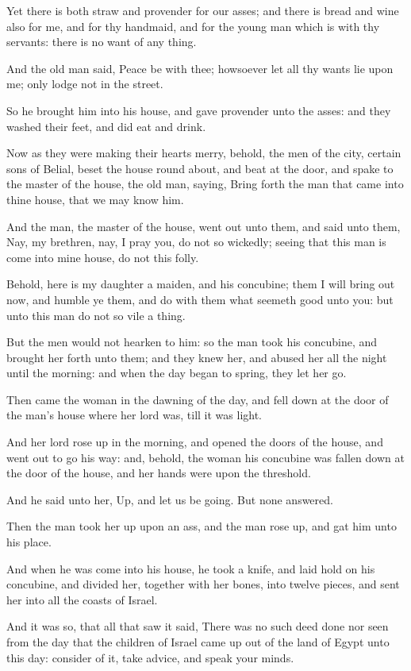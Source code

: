 \verse Yet there is both straw and provender for our asses; and there is bread and wine also for me, and for thy handmaid, and for the young man which is with thy servants: there is no want of any thing.

\verse And the old man said, Peace be with thee; howsoever let all thy wants lie upon me; only lodge not in the street.

\verse So he brought him into his house, and gave provender unto the asses: and they washed their feet, and did eat and drink.

\verse Now as they were making their hearts merry, behold, the men of the city, certain sons of Belial, beset the house round about, and beat at the door, and spake to the master of the house, the old man, saying, Bring forth the man that came into thine house, that we may know him.

\verse And the man, the master of the house, went out unto them, and said unto them, Nay, my brethren, nay, I pray you, do not so wickedly; seeing that this man is come into mine house, do not this folly.

\verse Behold, here is my daughter a maiden, and his concubine; them I will bring out now, and humble ye them, and do with them what seemeth good unto you: but unto this man do not so vile a thing.

\verse But the men would not hearken to him: so the man took his concubine, and brought her forth unto them; and they knew her, and abused her all the night until the morning: and when the day began to spring, they let her go.

\verse Then came the woman in the dawning of the day, and fell down at the door of the man's house where her lord was, till it was light.

\verse And her lord rose up in the morning, and opened the doors of the house, and went out to go his way: and, behold, the woman his concubine was fallen down at the door of the house, and her hands were upon the threshold.

\verse And he said unto her, Up, and let us be going. But none answered.

Then the man took her up upon an ass, and the man rose up, and gat him unto his place.

\verse And when he was come into his house, he took a knife, and laid hold on his concubine, and divided her, together with her bones, into twelve pieces, and sent her into all the coasts of Israel.

\verse And it was so, that all that saw it said, There was no such deed done nor seen from the day that the children of Israel came up out of the land of Egypt unto this day: consider of it, take advice, and speak your minds.


